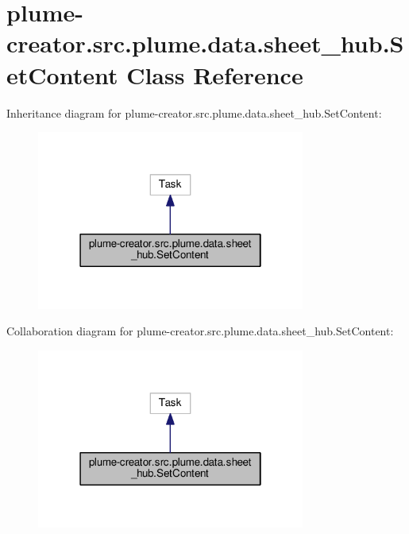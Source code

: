\hypertarget{classplume-creator_1_1src_1_1plume_1_1data_1_1sheet__hub_1_1_set_content}{}\section{plume-\/creator.src.\+plume.\+data.\+sheet\+\_\+hub.\+Set\+Content Class Reference}
\label{classplume-creator_1_1src_1_1plume_1_1data_1_1sheet__hub_1_1_set_content}


Inheritance diagram for plume-\/creator.src.\+plume.\+data.\+sheet\+\_\+hub.\+Set\+Content\+:\nopagebreak
\begin{figure}[H]
\begin{center}
\leavevmode
\includegraphics[width=250pt]{classplume-creator_1_1src_1_1plume_1_1data_1_1sheet__hub_1_1_set_content__inherit__graph}
\end{center}
\end{figure}


Collaboration diagram for plume-\/creator.src.\+plume.\+data.\+sheet\+\_\+hub.\+Set\+Content\+:\nopagebreak
\begin{figure}[H]
\begin{center}
\leavevmode
\includegraphics[width=250pt]{classplume-creator_1_1src_1_1plume_1_1data_1_1sheet__hub_1_1_set_content__coll__graph}
\end{center}
\end{figure}
